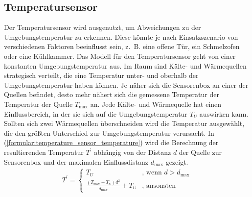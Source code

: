 \subsection{Temperatursensor}
Der Temperatursensor wird ausgenutzt, um Abweichungen zu der Umgebungstemperatur zu erkennen.
Diese könnte je nach Einsatzszenario von verschiedenen Faktoren beeinflusst sein, z.~B. eine offene Tür, ein Schmelzofen oder eine Kühlkammer.
\newline
\newline
Das Modell für den Temperatursensor geht von einer konstanten Umgebungstemperatur aus.
Im Raum sind Kälte- und Wärmequellen strategisch verteilt, die eine Temperatur unter- und oberhalb der Umgebungstemperatur haben können.
Je näher sich die Sensorenbox an einer der Quellen befindet, desto mehr nähert sich die gemessene Temperatur der Temperatur der Quelle $T_{\max}$ an.
\newline
\newline
Jede Kälte- und Wärmequelle hat einen Einflussbereich, in der sie sich auf die Umgebungstemperatur $T_U$ auswirken kann.
Sollten sich zwei Wärmequellen überschneiden wird die Temperatur ausgewählt, die den größten Unterschied zur Umgebungstemperatur verursacht.
In (\ref{formular:temperature_sensor_temperature}) wird die Berechnung der resultierenden Temperatur $T^{\prime}$ abhängig von der Distanz $d$ der
Quelle zur Sensorenbox und der maximalen Einflussdistanz $d_{\max}$ gezeigt.
\begin{align}
    \label{formular:temperature_sensor_temperature}
    T^{\prime} = \begin{cases}
                     T_U & \text{, wenn } d > d_{\max} \\
                     \frac{(T_{\max} - T_U)d^2}{d_{\max}} + T_U & \text{, ansonsten}
    \end{cases}
\end{align}

